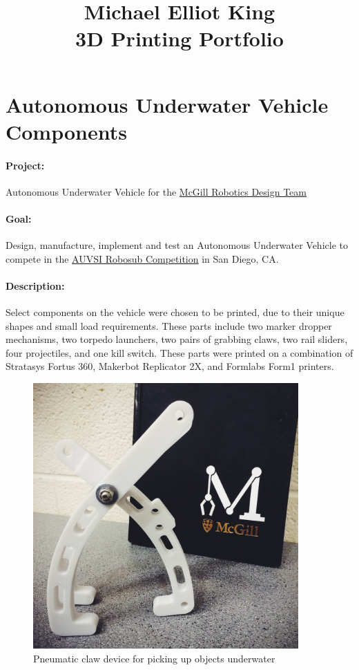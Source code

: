 \documentclass[12pt, landscape]{article}
\title{Michael Elliot King\\[10pt]
\Huge 3D Printing Portfolio}
\date{}
\begin{document}
\begin{titlepage}
\linespread{1}\maketitle
\thispagestyle{empty}
\end{titlepage}


\pagestyle{fancy}

	\section{Autonomous Underwater Vehicle Components}
		\paragraph{Project:} Autonomous Underwater Vehicle for the \href{http://www.mcgillrobotics.com}{McGill Robotics Design Team}
		\paragraph{Goal:} Design, manufacture, implement and test an Autonomous Underwater Vehicle to compete in the \href{http://www.robosub.org}{AUVSI Robosub Competition} in San Diego, CA.
		\paragraph{Description:} Select components on the vehicle were chosen to be printed, due to their unique shapes and small load requirements.  These parts include two marker dropper mechanisms, two torpedo launchers, two pairs of grabbing claws, two rail sliders, four projectiles, and one kill switch.  These parts were printed on a combination of Stratasys Fortus 360, Makerbot Replicator 2X, and Formlabs Form1 printers.

	\begin{figure}[H]
		\centering
		\includegraphics[height=4in]{media/grabber}
		\caption{Pneumatic claw device for picking up objects underwater}
		\label{grabber}
	\end{figure}
\end{document}
